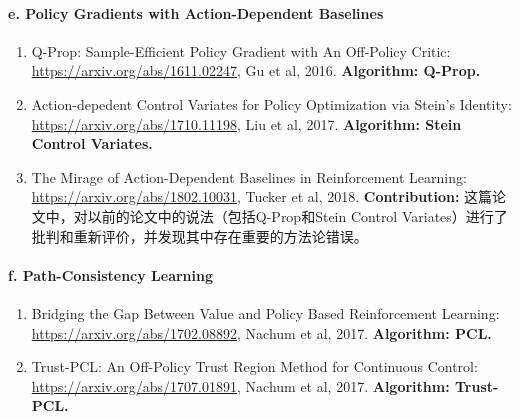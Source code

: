 \documentclass[lang=cn,11pt,a4paper]{eleganttemplate}
\begin{document}
\paragraph{e. Policy Gradients with Action-Dependent Baselines}
\begin{enumerate}
    \item Q-Prop: Sample-Efficient Policy Gradient with An Off-Policy Critic:\\ \href{https://arxiv.org/abs/1611.02247}{https://arxiv.org/abs/1611.02247}, Gu et al, 2016. \textbf{Algorithm: Q-Prop.}
    \item Action-depedent Control Variates for Policy Optimization via Stein’s Identity:\\ \href{https://arxiv.org/abs/1710.11198}{https://arxiv.org/abs/1710.11198}, Liu et al, 2017. \textbf{Algorithm: Stein Control Variates.}
    \item The Mirage of Action-Dependent Baselines in Reinforcement Learning:\\ \href{https://arxiv.org/abs/1802.10031}{https://arxiv.org/abs/1802.10031}, Tucker et al, 2018. \textbf{Contribution:} 这篇论文中，对以前的论文中的说法（包括Q-Prop和Stein Control Variates）进行了批判和重新评价，并发现其中存在重要的方法论错误。
\end{enumerate}

\paragraph{f. Path-Consistency Learning}
\begin{enumerate}
    \item Bridging the Gap Between Value and Policy Based Reinforcement Learning:\\ \href{https://arxiv.org/abs/1702.08892}{https://arxiv.org/abs/1702.08892}, Nachum et al, 2017. \textbf{Algorithm: PCL.}
    \item Trust-PCL: An Off-Policy Trust Region Method for Continuous Control:\\ \href{https://arxiv.org/abs/1707.01891}{https://arxiv.org/abs/1707.01891}, Nachum et al, 2017. \textbf{Algorithm: Trust-PCL.}
\end{enumerate}
\end{document}
